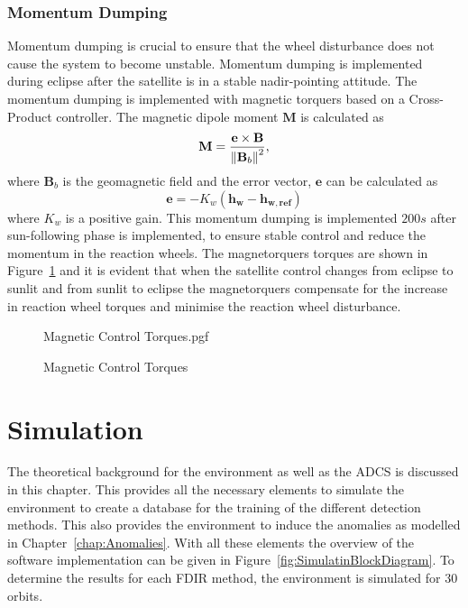 \subsubsection{Momentum Dumping}
Momentum dumping is crucial to ensure that the wheel disturbance does not cause the system to become unstable. Momentum dumping is implemented during eclipse after the satellite is in a stable nadir-pointing attitude. The momentum dumping is implemented with magnetic torquers based on a Cross-Product controller. The magnetic dipole moment $\mathbf{M}$ is calculated as 
\begin{equation}
	\mathbf{M} = \frac{\mathbf{e} \times \mathbf{B}}{\left\lVert\mathbf{B}_b\right\rVert^2},
\end{equation}
where $\mathbf{B}_b$ is the geomagnetic field and the error vector, $\mathbf{e}$ can be calculated as
\begin{equation}
	\mathbf{e} = -K_w(\mathbf{h_w} - \mathbf{h_{w,ref}})
\end{equation}
where $K_w$ is a positive gain. This momentum dumping is implemented $200s$ after sun-following phase is implemented, to ensure stable control and reduce the momentum in the reaction wheels. The magnetorquers torques are shown in Figure~\ref{fig:Magnetic Control Torques} and it is evident that when the satellite control changes from eclipse to sunlit and from sunlit to eclipse the magnetorquers compensate for the increase in reaction wheel torques and minimise the reaction wheel disturbance.

\begin{figure}[!htb]
	\centering
	\def\pgfwidth{10cm}
	{Magnetic Control Torques.pgf}
	
	\caption{Magnetic Control Torques}
	\label{fig:Magnetic Control Torques}
\end{figure}

\section{Simulation}
The theoretical background for the environment as well as the ADCS is discussed in this chapter. This provides all the necessary elements to simulate the environment to create a database for the training of the different detection methods. This also provides the environment to induce the anomalies as modelled in Chapter~\ref{chap:Anomalies}. With all these elements the overview of the software implementation can be given in Figure~\ref{fig:SimulatinBlockDiagram}. To determine the results for each FDIR method, the environment is simulated for $30$ orbits. 

